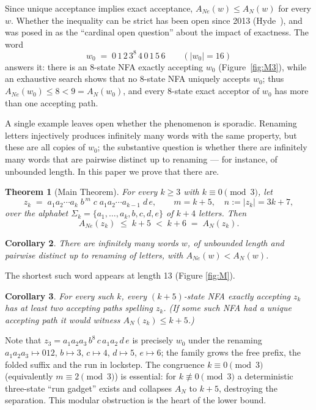 \documentclass[11pt]{article}
\newtheorem{theorem}{Theorem}[section]
\newtheorem{corollary}[theorem]{Corollary}
\theoremstyle{definition}
\newcommand{\AN}{A_N}
\newcommand{\ANe}{A_{Ne}}
\begin{document}
Since unique acceptance implies exact acceptance, $\ANe(w)\le\AN(w)$ for every
$w$. Whether the inequality can be strict has been open since 2013 (Hyde~\cite{H}), and was posed in \cite{CKKRS} as the
``cardinal open question'' about the impact of exactness. The word
\[
w_0 \;=\; 0\,1\,2\,3^8\,4\,0\,1\,5\,6 \qquad (|w_0|=16)
\]
answers it: there is an $8$-state NFA exactly accepting $w_0$
(Figure~\ref{fig:M3}), while an exhaustive search shows that no $8$-state NFA
uniquely accepts $w_0$; thus $\ANe(w_0)\le 8<9=\AN(w_0)$, and every $8$-state
exact acceptor of $w_0$ has more than one accepting path.

A single example leaves open whether the phenomenon is sporadic. Renaming
letters injectively produces infinitely many words with the same property, but
these are all copies of $w_0$; the substantive question is whether there are
infinitely many words that are pairwise distinct up to renaming --- for
instance, of unbounded length. In this paper we prove that there are.

\begin{theorem}[Main Theorem]\label{thm:main}
For every $k\ge 3$ with $k\equiv 0\pmod 3$, let
\[
z_k \;=\; a_1a_2\cdots a_k \; b^{\,m}\; c \; a_1a_2\cdots a_{k-1}\; d\, e,
\qquad m=k+5,\quad n:=|z_k|=3k+7,
\]
over the alphabet $\Sigma_k=\{a_1,\dots,a_k,b,c,d,e\}$ of $k+4$ letters. Then
\[
\ANe(z_k)\;\le\;k+5\;<\;k+6\;=\;\AN(z_k).
\]
\end{theorem}

\begin{corollary}\label{cor:inf}
There are infinitely many words $w$, of unbounded length and pairwise distinct
up to renaming of letters, with $\ANe(w)<\AN(w)$.
\end{corollary}

The shortest such word appears at length 13 (Figure \ref{fig:M}).

\begin{corollary}\label{cor:paths}
For every such $k$, every $(k+5)$-state NFA exactly accepting $z_k$ has at
least two accepting paths spelling $z_k$. (If some such NFA had a unique
accepting path it would witness $\AN(z_k)\le k+5$.)
\end{corollary}

Note that $z_3=a_1a_2a_3\,b^8\,c\,a_1a_2\,d\,e$ is precisely $w_0$ under the
renaming $a_1a_2a_3\mapsto 012$, $b\mapsto3$, $c\mapsto 4$, $d\mapsto5$,
$e\mapsto6$; the family grows the free prefix, the folded suffix and the
run in lockstep. The congruence $k\equiv0\pmod 3$ (equivalently
$m\equiv2\pmod3$) is essential: for $k\not\equiv0\pmod 3$ a deterministic
three-state ``run gadget'' exists and collapses $\AN$ to $k+5$, destroying the
separation. This modular obstruction is the heart of the lower bound.
\end{document}
